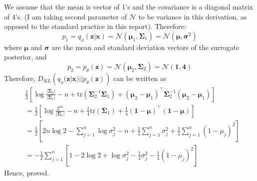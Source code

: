 \documentclass[12pt]{article}
\begin{document}
We assume that the mean is vector of 1's and the covariance is a diagonal matrix of 4's. (I am taking second parameter of $\mathcal{N}$ to be variance in this derivation, as opposed to the standard practice in this report). Therefore:
$$
p_1 = q_\phi(\mathbf{z}|\mathbf{x}) = \mathcal{N}(\boldsymbol{\mu}_1,\boldsymbol{\Sigma}_1) = \mathcal{N}(\boldsymbol{\mu},\boldsymbol{\sigma}^2)
$$
where $\boldsymbol{\mu}$ and $\boldsymbol{\sigma}$ are the mean and standard deviation vectors of the surrogate posterior, and
$$p_2 = p_\theta(\mathbf{z}) =\mathcal{N}(\boldsymbol{\mu}_2,\boldsymbol{\Sigma}_2) =\mathcal{N}(\mathbf{1},\mathbf{4})$$ 
Therefore, $D_{KL}\left(q_\phi(\mathbf{z}|\mathbf{x}) || p_\theta(\mathbf{z})\right) $ can be written as
\[
\begin{split}
& \frac{1}{2} \left[ \log\frac{|\boldsymbol{\Sigma}_2|}{|\boldsymbol{\Sigma}_1|} - n + \text{tr}(\boldsymbol{\Sigma}_2^{-1}\boldsymbol{\Sigma}_1) + (\boldsymbol{\mu}_2 - \boldsymbol{\mu}_1)^\intercal \boldsymbol{\Sigma}_2^{-1}(\boldsymbol{\mu}_2 - \boldsymbol{\mu}_1) \right] \\
& = \frac{1}{2}\left[ \log\frac{2^{2n}}{|\boldsymbol{\Sigma}_1|} - n + \frac{1}{4} \text{tr}(\boldsymbol{\Sigma}_1) + \frac{1}{4}(\mathbf{1} - \boldsymbol{\mu})^\intercal(\mathbf{1} - \boldsymbol{\mu}) \right] \\
& = \frac{1}{2}\left[ 2n\log2 - \sum_{j=1}^n \log\sigma_j^2 - n + \frac{1}{4}\sum_{j=1}^n \sigma_j^2 + \frac{1}{4}\sum_{j=1}^n (1 - \mu_j)^2 \right] \\
& = -\frac{1}{2}\sum_{j=1}^n \left[ 1 - 2\log2 + \log\sigma_j^2  - \frac{1}{4}\sigma_j^2 - \frac{1}{4}(1 - \mu_j)^2 \right]
\end{split}
\]
Hence, proved.

\pagebreak


\end{document}
